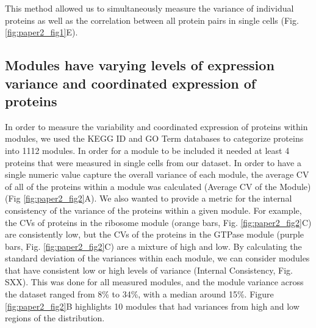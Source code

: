 This method allowed us to simultaneously measure the variance of individual proteins as well as the correlation between all protein pairs in single cells (Fig. \ref{fig:paper2_fig1}E).

\subsection{Modules have varying levels of expression variance and coordinated expression of proteins}

In order to measure the variability and coordinated expression of proteins within modules, we used the KEGG ID and GO Term databases to categorize proteins into 1112 modules. In order for a module to be included it needed at least 4 proteins that were measured in single cells from our dataset. In order to have a single numeric value capture the overall variance of each module, the average CV of all of the proteins within a module was calculated (Average CV of the Module) (Fig \ref{fig:paper2_fig2}A). We also wanted to provide a metric for the internal consistency of the variance of the proteins within a given module. For example, the CVs of proteins in the ribosome module (orange bars, Fig. \ref{fig:paper2_fig2}C) are consistently low, but the CVs of the proteins in the GTPase module (purple bars, Fig. \ref{fig:paper2_fig2}C) are a mixture of high and low.  By calculating the standard deviation of the variances within each module, we can consider modules that have consistent low or high levels of variance (Internal Consistency, Fig. SXX). This was done for all measured modules, and the module variance across the dataset ranged from 8\% to 34\%, with a median around 15\%. Figure \ref{fig:paper2_fig2}B highlights 10 modules that had variances from high and low regions of the distribution. 

